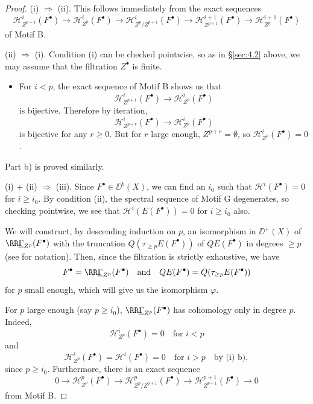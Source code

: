 \begin{proof}
(i) $\Longrightarrow$ (ii). This follows immediately from the exact sequences
\[
\mathcal{H}_{Z^{p+1}}^{i}(F^\bullet)\longrightarrow \mathcal{H}_{Z^{p}}^{i}(F^\bullet)\longrightarrow \mathcal{H}_{Z^{p}/Z^{p+1}}^{i}(F^\bullet)\longrightarrow \mathcal{H}_{Z^{p+1}}^{i+1}(F^\bullet)\longrightarrow \mathcal{H}_{Z^{p}}^{i+1}(F^\bullet)
\]
of Motif B.

(ii) $\Longrightarrow$ (i). Condition (i) can be checked pointwise, so as in \S\ref{sec:4.2} above, we may assume that the filtration $Z^\bullet$ is finite.
\begin{itemize}
\item[a)] For $i<p$, the exact sequence of Motif B shows us that
\[
\mathcal{H}_{Z^{p+1}}^{i}(F^\bullet)\longrightarrow \mathcal{H}_{Z^{p}}^{i}(F^\bullet)
\]
is bijective. Therefore by iteration,
\[
\mathcal{H}_{Z^{p+r}}^{i}(F^\bullet)\longrightarrow \mathcal{H}_{Z^{p}}^{i}(F^\bullet)
\]
is bijective for any $r\geq 0$. But for $r$ large enough, $Z^{p+r}=\emptyset$, so $\mathcal{H}_{Z^{p}}^{i}(F^\bullet)=0$.
\end{itemize}
Part b) is proved similarly.

(i) + (ii) $\Longrightarrow$ (iii). Since $F^\bullet\in\DD^b(X)$, we can find an $i_0$ such that $\mathcal{H}^{i}(F^\bullet)=0$ for $i\geq i_0$. By condition (ii), the spectral sequence of Motif G degenerates, so checking pointwise, we see that $\mathcal{H}^{i}(E(F^\bullet))=0$ for $i\geq i_0$ also.

We will construct, by descending induction on $p$, an isomorphism in $\DD^+(X)$ of $\RR\underline{\Gamma}_{Z^p}(F^\bullet)$ with the truncation $Q(\tau_{\geq p}E(F^\bullet))$ of $QE(F^\bullet)$ in degrees $\geq p$ (see  for notation). Then, since the filtration is strictly exhaustive, we have
\[
F^\bullet = \RR\underline{\Gamma}_{Z^p}(F^\bullet)\quad\text{and}\quad QE(F^\bullet)=Q(\tau_{\geq p}E(F^\bullet))
\]
for $p$ small enough, which will give us the isomorphism $\varphi$.

For $p$ large enough (say $p\geq i_0$), $\RR\underline{\Gamma}_{Z^p}(F^\bullet)$ has cohomology only in degree $p$. Indeed,
\[
\mathcal{H}_{Z^{p}}^{i}(F^\bullet)=0\quad\text{for }i<p
\]
and
\[
\mathcal{H}_{Z^{p}}^{i}(F^\bullet)=\mathcal{H}^{i}(F^\bullet)=0\quad\text{for } i>p \quad\text{by (i) b)},
\]
since $p\geq i_0$. Furthermore, there is an exact sequence
\begin{equation}\tag{1}\label{eq:4.3.1}
0\longrightarrow \mathcal{H}_{Z^{p}}^{p}(F^\bullet)\longrightarrow \mathcal{H}_{Z^{p}/Z^{p+1}}^{p}(F^\bullet)\longrightarrow \mathcal{H}_{Z^{p+1}}^{p+1}(F^\bullet)\longrightarrow 0
\end{equation}
from Motif B.


\end{proof}
